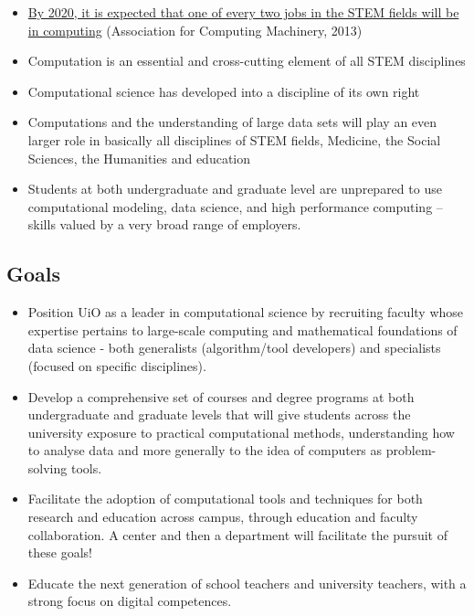 \documentclass[%
oneside,                 %
final,                   %
10pt]{article}
\begin{document}
\begin{itemize}
\item \href{{http://pathways.acm.org/executive-summary.html}}{By 2020, it is expected that one of every two jobs in the STEM fields will be in computing} (Association for Computing Machinery, 2013)

\item Computation is an essential and cross-cutting element of all STEM disciplines

\item Computational science has developed into a discipline of its own right

\item Computations and the understanding of large data sets will play an even larger role in basically all disciplines of STEM fields, Medicine, the Social Sciences, the Humanities and  education

\item Students at both undergraduate and graduate level are unprepared to use computational modeling, data science, and high performance computing – skills valued by a very broad range of employers.
\end{itemize}

\noindent
\subsection*{Goals}

\begin{itemize}
\item Position UiO  as a leader in computational science by recruiting faculty whose expertise pertains to large-scale computing and mathematical foundations of data science - both generalists (algorithm/tool developers) and specialists (focused on specific disciplines).	

\item Develop a comprehensive set of courses and degree programs at both undergraduate and graduate levels that will give students across the university exposure to practical computational methods, understanding how to analyse data and more generally to the idea of computers as problem-solving tools.	

\item Facilitate the adoption of computational tools and techniques for both research and education across campus, through education and faculty collaboration. A center and then a department will facilitate the pursuit of these goals!	

\item Educate the next generation of school teachers and university teachers,  with a strong focus on digital competences. 
\end{itemize}
\end{document}
